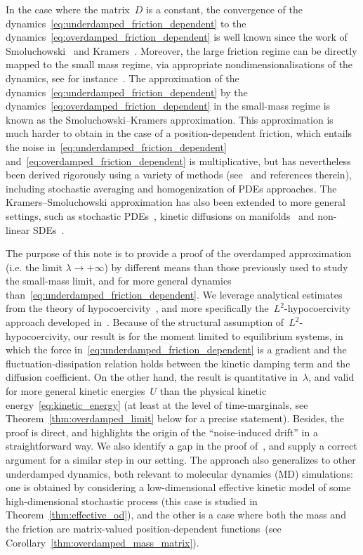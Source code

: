 \documentclass[10pt]{article}
\newcommand{\1}{\mathbbm 1}
\begin{document}
In the case where the matrix~$D$ is a constant, the convergence of the dynamics~\eqref{eq:underdamped_friction_dependent} to the dynamics~\eqref{eq:overdamped_friction_dependent} is well known since the work of Smoluchowski~\cite{S16} and Kramers~\cite{K40}. Moreover, the large friction regime can be directly mapped to the small mass regime, via appropriate nondimensionalisations of the dynamics, see for instance~\cite[Section 2.2.4]{LRS10}.
The approximation of the dynamics~\eqref{eq:underdamped_friction_dependent} by the dynamics~\eqref{eq:overdamped_friction_dependent} in the small-mass regime is known as the Smoluchowski--Kramers approximation.
This approximation is much harder to obtain in the case of a position-dependent friction, which entails the noise in~\eqref{eq:underdamped_friction_dependent} and~\eqref{eq:overdamped_friction_dependent} is multiplicative, but has nevertheless been derived rigorously using a variety of methods (see~\cite{F04,FH12,HMVW15,WSW24} and references therein), including stochastic averaging and homogenization of PDEs approaches. The Kramers--Smoluchowski approximation has also been extended to more general settings, such as stochastic PDEs~\cite{C06}, kinetic diffusions on manifolds~\cite{BHVW17} and non-linear SDEs~\cite{LJW24}.

The purpose of this note is to provide a proof of the overdamped approximation (i.e. the limit $\lambda\to +\infty$) by different means than those previously used to study the small-mass limit, and for more general dynamics than~\eqref{eq:underdamped_friction_dependent}. We leverage analytical estimates from the theory of hypocoercivity~\cite{V06}, and more specifically the~$L^2$-hypocoercivity approach developed in~\cite{DKMS13,DMS15,BFLS22}.
Because of the structural assumption of~$L^2$-hypocoercivity, our result is for the moment limited to equilibrium systems, in which the force in~\eqref{eq:underdamped_friction_dependent} is a gradient and the fluctuation-dissipation relation holds between the kinetic damping term and the diffusion coefficient.
On the other hand, the result is quantitative in~$\lambda$, and valid for more general kinetic energies~$U$ than the physical kinetic energy~\eqref{eq:kinetic_energy} (at least at the level of time-marginals, see Theorem~\ref{thm:overdamped_limit} below for a precise statement). Besides, the proof is direct, and highlights the origin of the ``noise-induced drift'' in a straightforward way. We also identify a gap in the proof of~\cite[Lemma~3.1]{WSW24}, and supply a correct argument for a similar step in our setting.
The approach also generalizes to other underdamped dynamics, both relevant to molecular dynamics (MD) simulations: one is obtained by considering a low-dimensional effective kinetic model of some high-dimensional stochastic process (this case is studied in Theorem~\eqref{thm:effective_od}), and the other is a case where both the mass and the friction are matrix-valued position-dependent functions~(see Corollary~\ref{thm:overdamped_mass_matrix}).
\end{document}
